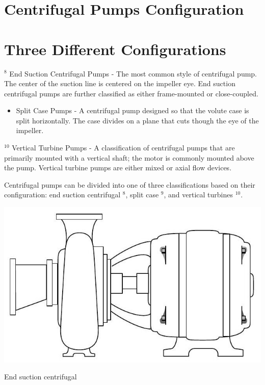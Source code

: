 \documentclass[10pt]{article}
\begin{document}
\section{Centrifugal Pumps Configuration}
\section{Three Different Configurations}
${ }^{8}$ End Suction Centrifugal Pumps - The most common style of centrifugal pump. The center of the suction line is centered on the impeller eye. End suction centrifugal pumps are further classified as either frame-mounted or close-coupled.

\begin{itemize}
  \item Split Case Pumps - A centrifugal pump designed so that the volute case is split horizontally. The case divides on a plane that cuts though the eye of the impeller.
\end{itemize}
${ }^{10}$ Vertical Turbine Pumps - A classification of centrifugal pumps that are primarily mounted with a vertical shaft; the motor is commonly mounted above the pump. Vertical turbine pumps are either mixed or axial flow devices.

Centrifugal pumps can be divided into one of three classifications based on their configuration: end suction centrifugal ${ }^{8}$, split case $^{9}$, and vertical turbines ${ }^{10}$.

\includegraphics[max width=\textwidth]{CentrifugalEndSuction}

End suction centrifugal
\end{document}
